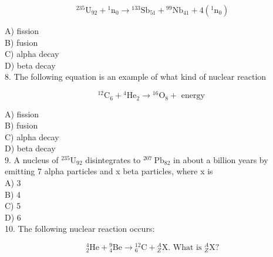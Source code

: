 \begin{enumerate}
$$
{ }^{235} \mathrm{U}_{92}+{ }^{1} \mathrm{n}_{0} \rightarrow{ }^{133} \mathrm{Sb}_{51}+{ }^{99} \mathrm{Nb}_{41}+4\left({ }^{1} \mathrm{n}_{0}\right)
$$

A) fission\\
B) fusion\\
C) alpha decay\\
D) beta decay\\
8. The following equation is an example of what kind of nuclear reaction

$$
{ }^{12} \mathrm{C}_{6}+{ }^{4} \mathrm{He}_{2} \rightarrow{ }^{16} \mathrm{O}_{8}+\text { energy }
$$

A) fission\\
B) fusion\\
C) alpha decay\\
D) beta decay\\
9. A nucleus of ${ }^{235} \mathrm{U}_{92}$ disintegrates to ${ }^{207} \mathrm{~Pb}_{82}$ in about a billion years by emitting 7 alpha particles and x beta particles, where x is\\
A) 3\\
B) 4\\
C) 5\\
D) 6\\
10. The following nuclear reaction occurs:

$$
{ }_{2}^{4} \mathrm{He}+{ }_{4}^{9} \mathrm{Be} \rightarrow{ }_{6}^{12} \mathrm{C}+{ }_{Z}^{A} \mathrm{X} . \text { What is }{ }_{Z}^{A} \mathrm{X} ?
$$


\end{enumerate}
